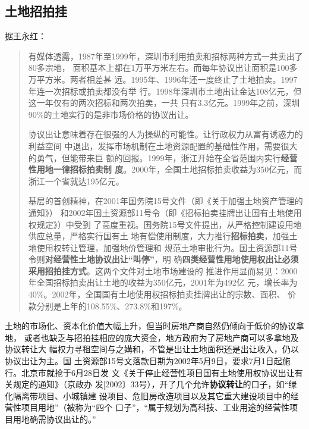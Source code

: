 
\subsection{土地招拍挂}
据王永红：
\begin{quotation}
  有媒体透露，1987年至1999年，深圳市利用拍卖和招标两种方式一共卖出了80多宗地，
  面积基本上都在1万平方米左右。而每年协议出让面积是100多万平方米。两者相差甚
  远。1995年、1996年还一度终止了土地拍卖。1997年连一次招标或拍卖都没有举
  行。1998年深圳市土地出让金达108亿元，但这一年仅有的两次招标和两次拍卖，一共
  只有3.3亿元。1999年之前，深圳90\%的土地实行的是非市场价格的协议出让。

  协议出让意味着存在很强的人为操纵的可能性。让行政权力从富有诱惑力的利益空间
  中退出，发挥市场机制在土地资源配置的基础性作用，需要很大的勇气，但能带来巨
  额的回报。1999年，浙江开始在全省范围内实行\textbf{经营性用地一律招标拍卖制
    度}。2000年，全国土地招标拍卖收益为350亿元，而浙江一个省就达195亿元。

  基层的首创精神，在2001年国务院15号文件（即《关于加强土地资产管理的通知》）
  和2002年国土资源部11号令（即《招标拍卖挂牌出让国有土地使用权规定》）中受到
  了高度重视。国务院15号文件提出，从严格控制建设用地供应总量，严格实行国有土
  地有偿使用制度，大力推行\textbf{招标拍卖}，加强土地使用权转让管理，加强地价管理和
  规范土地审批行为。国土资源部11号令则\textbf{对经营性土地协议出让“叫停”}，明
  确\textbf{四类经营性用地使用权出让必须采用招拍挂方式}。这两个文件对土地市场建设的
  推进作用显而易见：2000年全国招标拍卖出让土地的收益为350亿元，2001年为492亿
  元，增长率为40\%。2002年，全国国有土地使用权招标拍卖挂牌出让的宗数、面积、
  价款分别是上年的108.55\%、273.8\%和197\%。
\end{quotation}

土地的市场化、资本化价值大幅上升，但当时房地产商自然仍倾向于低价的协议拿地，
或者也缺乏与招拍挂相应的庞大资金，地方政府为了房地产商可以多拿地及协议转让大
幅权力寻租空间与之媾和，不管是出让土地面积还是出让收入，仍以协议出让为主。国
土资源部15号文落款日期为2002年5月9日，要求7月1日起施行。北京市就抢于6月28日发
文《关于停止经营性项目国有土地使用权协议出让有关规定的通知》（京政办
发[2002〕33号），开了几个允许\textbf{协议转让}的口子，如“绿化隔离带项目、小城镇建
设项目、危旧房改造项目以及其它重大建设项目中的经营性项目用地”（被称为“四个
口子”，“属于规划为高科技、工业用途的经营性项目用地确需协议出让的。”

